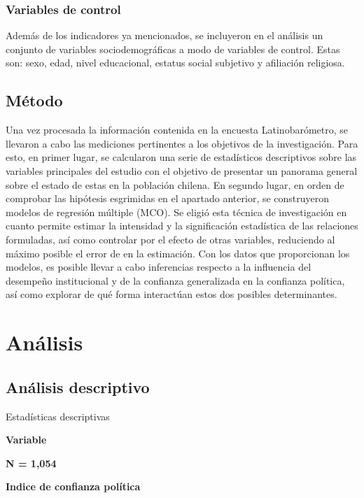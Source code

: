 \documentclass[12pt,twoside]{templates/facsothesis}
\begin{document}
\subsection{Variables de control}\label{variables-de-control}

Además de los indicadores ya mencionados, se incluyeron en el análisis un conjunto de variables sociodemográficas a modo de variables de control. Estas son: sexo, edad, nivel educacional, estatus social subjetivo y afiliación religiosa.

\section{Método}\label{muxe9todo}

Una vez procesada la información contenida en la encuesta Latinobarómetro, se llevaron a cabo las mediciones pertinentes a los objetivos de la investigación. Para esto, en primer lugar, se calcularon una serie de estadísticos descriptivos sobre las variables principales del estudio con el objetivo de presentar un panorama general sobre el estado de estas en la población chilena. En segundo lugar, en orden de comprobar las hipótesis esgrimidas en el apartado anterior, se construyeron modelos de regresión múltiple (MCO). Se eligió esta técnica de investigación en cuanto permite estimar la intensidad y la significación estadística de las relaciones formuladas, así como controlar por el efecto de otras variables, reduciendo al máximo posible el error de en la estimación. Con los datos que proporcionan los modelos, es posible llevar a cabo inferencias respecto a la influencia del desempeño institucional y de la confianza generalizada en la confianza política, así como explorar de qué forma interactúan estos dos posibles determinantes.

\chapter{Análisis}\label{anuxe1lisis}

\section{Análisis descriptivo}\label{anuxe1lisis-descriptivo}

\label{tab:tabla-1}Estadísticas descriptivas

\textbf{Variable}

\textbf{N = 1,054}

\textbf{Indice de confianza política}
\end{document}
